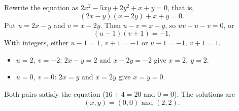 Rewrite the equation as \(2x^2-5xy+2y^2+x+y=0\), that is,
\[
(2x-y)(x-2y)+x+y=0.
\]
Put \(u=2x-y\) and \(v=x-2y\). Then \(u-v=x+y\), so \(uv+u-v=0\), or
\[
(u-1)(v+1)=-1.
\]
With integers, either \(u-1=1,\ v+1=-1\) or \(u-1=-1,\ v+1=1\).
\begin{itemize}
\item \(u=2,\ v=-2\): \(2x-y=2\) and \(x-2y=-2\) give \(x=2,\ y=2\).
\item \(u=0,\ v=0\): \(2x=y\) and \(x=2y\) give \(x=y=0\).
\end{itemize}
Both pairs satisfy the equation (\(16+4=20\) and \(0=0\)). The solutions are
\[
\boxed{(x,y)=(0,0)\text{ and }(2,2)}.
\]
